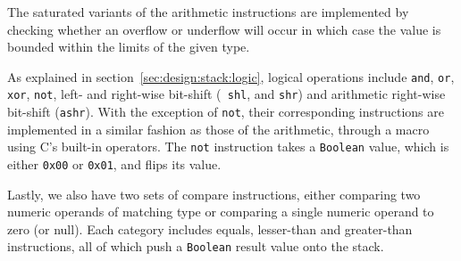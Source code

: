 The saturated variants of the arithmetic instructions are implemented by
checking whether an overflow or underflow will occur in which case the value is
bounded within the limits of the given type.

As explained in section~\ref{sec:design:stack:logic}, logical operations include
{\tt and}, {\tt or}, {\tt xor}, {\tt not}, left- and right-wise bit-shift ({\tt
  shl}, and {\tt shr}) and arithmetic right-wise bit-shift ({\tt ashr}). With
the exception of {\tt not}, their corresponding instructions are implemented in
a similar fashion as those of the arithmetic, through a macro using C's built-in
operators. The {\tt not} instruction takes a {\tt Boolean} value, which is
either {\tt 0x00} or {\tt 0x01}, and flips its value.

Lastly, we also have two sets of compare instructions, either comparing two
numeric operands of matching type or comparing a single numeric operand to zero
(or null). Each category includes equals, lesser-than and greater-than
instructions, all of which push a {\tt Boolean} result value onto the stack.

